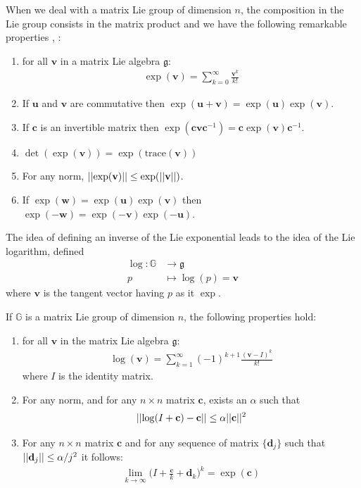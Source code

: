 When we deal with a matrix Lie group of dimension $n$, the composition in the Lie group consists in the matrix product and we have the following remarkable properties \cite{hall2015lie}, \cite{kirillov2008introduction}:
\begin{enumerate}
	\item for all $\mathbf{v}$ in a matrix Lie algebra $\mathfrak{g}$:
	\begin{align}\label{eq:exp_as_inf_sum}
	\exp(\mathbf{v}) = \sum_{k=0}^{\infty} \frac{\mathbf{v}^{k}}{k!}
	\end{align}
	\item If $\mathbf{u}$ and $\mathbf{v}$ are commutative then $\exp(\mathbf{u} + \mathbf{v}) = \exp(\mathbf{u})\exp(\mathbf{v})$.
	\item If $\mathbf{c}$ is an invertible matrix then $\exp(\mathbf{c}\mathbf{v}\mathbf{c}^{-1}) = \mathbf{c}\exp(\mathbf{v})\mathbf{c}^{-1}$.
	\item $\det(\exp(\mathbf{v})) = \exp(\text{trace}(\mathbf{v}))$
	\item For any norm, $\vert\lvert \exp(\mathbf{v}) \rvert\vert \leq \exp(\vert\lvert \mathbf{v} \rvert\vert)$.
	\item If $\exp(\mathbf{w}) = \exp(\mathbf{u})  \exp(\mathbf{v})$ then $\exp(\mathbf{-w}) = \exp(\mathbf{-v}) \exp(\mathbf{-u})$.
\end{enumerate}
The idea of defining an inverse of the Lie exponential leads to the idea of the Lie logarithm, defined
\begin{align*}
\log : \mathbb{G} & \longrightarrow \mathfrak{g} \\
p &\longmapsto \log (p)  =  \mathbf{v}   
\end{align*}
where $\mathbf{v}  $ is the tangent vector having $p$ as it $\exp$.

\noindent
If $\mathbb{G}$ is a matrix Lie group of dimension $n$, the following properties hold:
\begin{enumerate}
	\item for all $\mathbf{v}$ in the matrix Lie algebra $\mathfrak{g}$:
	\begin{align}\label{eq:log_as_inf_sum}
	\log(\mathbf{v}) = \sum_{k=1}^{\infty}(-1)^{k+1} \frac{(\mathbf{v}-I)^{k} }{k!}
	\end{align}
	where $I$ is the identity matrix.
	\item For any norm, and for any $n\times n$ matrix $\mathbf{c}$, exists an $\alpha$ such that 
	\begin{align*}
	\vert\lvert  \log(I + \mathbf{c}) - \mathbf{c}  \rvert\vert  \leq \alpha \vert\lvert  \mathbf{c} \rvert\vert^{2}
	\end{align*}
	\item For any $n\times n$ matrix $\mathbf{c}$ and for any sequence of matrix $\{\mathbf{d}_{j}\}$ such that  $\vert\lvert  \mathbf{d}_{j} \rvert\vert \leq \alpha/j^2$ it follows:
	\begin{align*}
	\lim_{k\rightarrow \infty} \big( I + \frac{\mathbf{c}}{k} + \mathbf{d}_{k} \big)^{k} = \exp{(\mathbf{c})}
	\end{align*}
\end{enumerate} 

